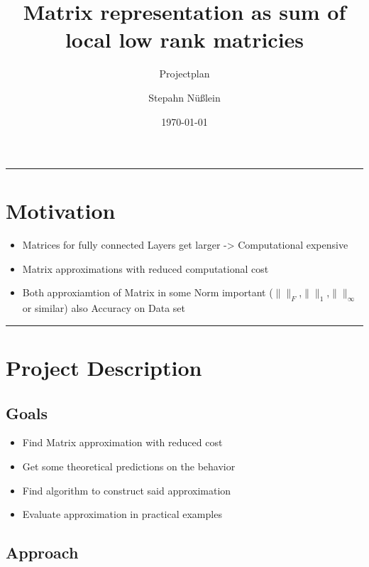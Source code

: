 \documentclass[lang=ngerman,inputenc=utf8,fontsize=10pt]{ldvarticle}
\title{Matrix representation as sum of local low rank matricies}
\subtitle{Projectplan}
\author{Stepahn Nüßlein}
\date{\today}
\begin{document}
	\maketitle
	\thispagestyle{empty}
	\vspace*{2cm}
	\hrule

\section*{Motivation}

\begin{itemize}
	\item Matrices for fully connected Layers get larger -> Computational expensive 
	\item Matrix approximations with reduced computational cost
	\item Both approxiamtion of Matrix in some Norm important ($\|\|_F$,$\|\|_1$,$\|\|_\infty$ or similar) also Accuracy on Data set
\end{itemize}




\vspace*{1cm}
\hrule

\newpage

\section{Project Description}

\subsection*{Goals}

\begin{itemize}
	\item Find Matrix approximation with reduced cost
	\item Get some theoretical predictions on the behavior
	\item Find algorithm to construct said approximation
	\item Evaluate approximation in practical examples
\end{itemize}











\subsection*{Approach}
\end{document}
